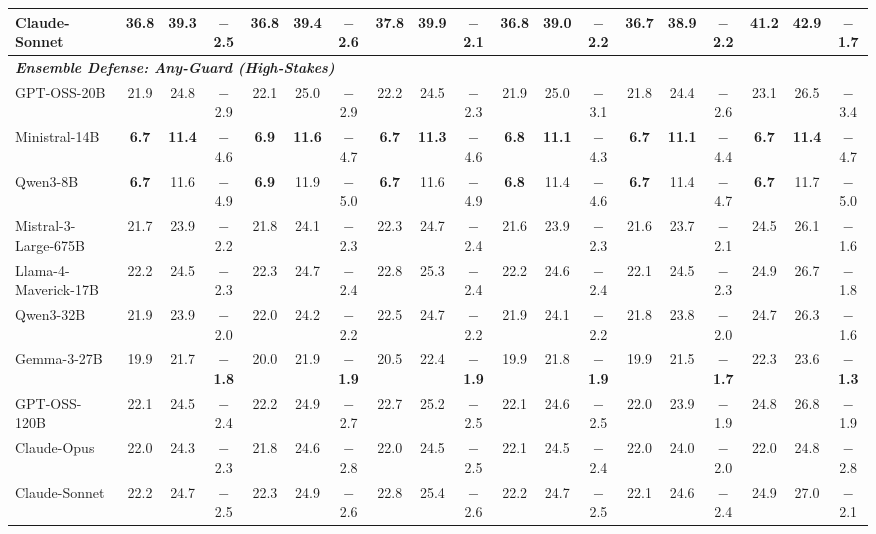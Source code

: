 \begin{table}[t]
{\begin{tabular}{l ccc ccc ccc ccc ccc ccc}
Claude-Sonnet & 36.8 & 39.3 & $-$2.5 & 36.8 & 39.4 & $-$2.6 & 37.8 & 39.9 & $-$2.1 & 36.8 & 39.0 & $-$2.2 & 36.7 & 38.9 & $-$2.2 & 41.2 & 42.9 & $-$1.7 \\
\midrule
\multicolumn{19}{l}{\textbf{\textit{Ensemble Defense: Any-Guard (High-Stakes)}}} \\
GPT-OSS-20B & 21.9 & 24.8 & $-$2.9 & 22.1 & 25.0 & $-$2.9 & 22.2 & 24.5 & $-$2.3 & 21.9 & 25.0 & $-$3.1 & 21.8 & 24.4 & $-$2.6 & 23.1 & 26.5 & $-$3.4 \\
Ministral-14B & \textbf{6.7} & \textbf{11.4} & $-$4.6 & \textbf{6.9} & \textbf{11.6} & $-$4.7 & \textbf{6.7} & \textbf{11.3} & $-$4.6 & \textbf{6.8} & \textbf{11.1} & $-$4.3 & \textbf{6.7} & \textbf{11.1} & $-$4.4 & \textbf{6.7} & \textbf{11.4} & $-$4.7 \\
Qwen3-8B & \textbf{6.7} & 11.6 & $-$4.9 & \textbf{6.9} & 11.9 & $-$5.0 & \textbf{6.7} & 11.6 & $-$4.9 & \textbf{6.8} & 11.4 & $-$4.6 & \textbf{6.7} & 11.4 & $-$4.7 & \textbf{6.7} & 11.7 & $-$5.0 \\
Mistral-3-Large-675B & 21.7 & 23.9 & $-$2.2 & 21.8 & 24.1 & $-$2.3 & 22.3 & 24.7 & $-$2.4 & 21.6 & 23.9 & $-$2.3 & 21.6 & 23.7 & $-$2.1 & 24.5 & 26.1 & $-$1.6 \\
Llama-4-Maverick-17B & 22.2 & 24.5 & $-$2.3 & 22.3 & 24.7 & $-$2.4 & 22.8 & 25.3 & $-$2.4 & 22.2 & 24.6 & $-$2.4 & 22.1 & 24.5 & $-$2.3 & 24.9 & 26.7 & $-$1.8 \\
Qwen3-32B & 21.9 & 23.9 & $-$2.0 & 22.0 & 24.2 & $-$2.2 & 22.5 & 24.7 & $-$2.2 & 21.9 & 24.1 & $-$2.2 & 21.8 & 23.8 & $-$2.0 & 24.7 & 26.3 & $-$1.6 \\
Gemma-3-27B & 19.9 & 21.7 & \textbf{$-$1.8} & 20.0 & 21.9 & \textbf{$-$1.9} & 20.5 & 22.4 & \textbf{$-$1.9} & 19.9 & 21.8 & \textbf{$-$1.9} & 19.9 & 21.5 & \textbf{$-$1.7} & 22.3 & 23.6 & \textbf{$-$1.3} \\
GPT-OSS-120B & 22.1 & 24.5 & $-$2.4 & 22.2 & 24.9 & $-$2.7 & 22.7 & 25.2 & $-$2.5 & 22.1 & 24.6 & $-$2.5 & 22.0 & 23.9 & $-$1.9 & 24.8 & 26.8 & $-$1.9 \\
Claude-Opus & 22.0 & 24.3 & $-$2.3 & 21.8 & 24.6 & $-$2.8 & 22.0 & 24.5 & $-$2.5 & 22.1 & 24.5 & $-$2.4 & 22.0 & 24.0 & $-$2.0 & 22.0 & 24.8 & $-$2.8 \\
Claude-Sonnet & 22.2 & 24.7 & $-$2.5 & 22.3 & 24.9 & $-$2.6 & 22.8 & 25.4 & $-$2.6 & 22.2 & 24.7 & $-$2.5 & 22.1 & 24.6 & $-$2.4 & 24.9 & 27.0 & $-$2.1 \\
\bottomrule
\end{tabular}
}
\end{table}